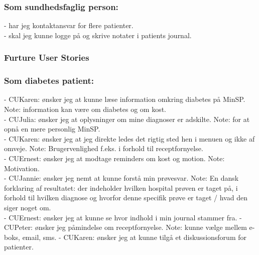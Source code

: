 \subsubsection*{Som sundhedsfaglig person:}
- har jeg kontaktansvar for flere patienter.\\
- skal jeg kunne logge på og skrive notater i patients journal.\\
\subsubsection{\textbf{Furture User Stories}}
\subsubsection*{Som diabetes patient:}
- CUKaren: ønsker jeg at kunne læse information omkring diabetes på MinSP. Note: information kan være om diabetes og om kost.\\
- CUJulia: ønsker jeg at oplysninger om mine diagnoser er adskilte. Note: for at opnå en mere personlig MinSP.\\
- CUKaren: ønsker jeg at jeg direkte ledes det rigtig sted hen i menuen og ikke af omveje. Note: Brugervenlighed f.eks. i forhold til receptfornyelse.\\ 
- CUErnest: ønsker jeg at modtage reminders om kost og motion. Note: Motivation. \\
- CUJannie: ønsker jeg nemt at kunne forstå min prøvesvar. Note: En dansk forklaring af resultatet: der indeholder hvilken hospital prøven er taget på, i forhold til hvilken diagnose og hvorfor denne specifik prøve er taget / hvad den siger noget om. \\%
- CUErnest: ønsker jeg at kunne se hvor indhold i min journal stammer fra.
- CUPeter: ønsker jeg påmindelse om receptfornyelse. Note: kunne vælge mellem e-boks, email, sms.
- CUKaren: ønsker jeg at kunne tilgå et diskussionsforum for patienter.\\
%
